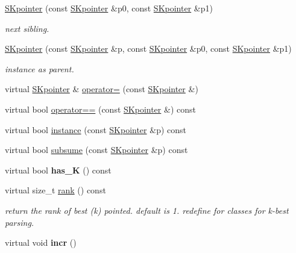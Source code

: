 \begin{DoxyCompactItemize}
\mbox{\hyperlink{group__table_gaf762b88808d2e8188b74e28256d3ed09}{S\+Kpointer}} (const \mbox{\hyperlink{classSKpointer}{S\+Kpointer}} \&p0, const \mbox{\hyperlink{classSKpointer}{S\+Kpointer}} \&p1)
\begin{DoxyCompactList}\small\item\em next sibling. \end{DoxyCompactList}\item 
\mbox{\hyperlink{group__table_ga8c3f64b049fb3809bec46ba47a124ab9}{S\+Kpointer}} (const \mbox{\hyperlink{classSKpointer}{S\+Kpointer}} \&p, const \mbox{\hyperlink{classSKpointer}{S\+Kpointer}} \&p0, const \mbox{\hyperlink{classSKpointer}{S\+Kpointer}} \&p1)
\begin{DoxyCompactList}\small\item\em instance as parent. \end{DoxyCompactList}\item 
virtual \mbox{\hyperlink{classSKpointer}{S\+Kpointer}} \& \mbox{\hyperlink{group__table_gaa75ae4ae4ce8c389471867fa64f503c1}{operator=}} (const \mbox{\hyperlink{classSKpointer}{S\+Kpointer}} \&)
\item 
virtual bool \mbox{\hyperlink{group__table_gab77c2fa945fcc938568ace9986c25324}{operator==}} (const \mbox{\hyperlink{classSKpointer}{S\+Kpointer}} \&) const
\item 
virtual bool \mbox{\hyperlink{group__table_ga95bdb4d9654b477a82f61d4e8b1d6937}{instance}} (const \mbox{\hyperlink{classSKpointer}{S\+Kpointer}} \&p) const
\item 
virtual bool \mbox{\hyperlink{group__table_ga38150ffb7a8bf25ebf5133907d568738}{subsume}} (const \mbox{\hyperlink{classSKpointer}{S\+Kpointer}} \&p) const
\item 
\mbox{\label{classSKpointer_afe3aef0a71afa0e6d022c52aa0f28163}} 
virtual bool {\bfseries has\+\_\+K} () const
\item 
\mbox{\label{classSKpointer_ae7afb64da3fbb9fc0487913f3ee594a3}} 
virtual size\+\_\+t \mbox{\hyperlink{classSKpointer_ae7afb64da3fbb9fc0487913f3ee594a3}{rank}} () const
\begin{DoxyCompactList}\small\item\em return the rank of best (k) pointed. default is 1. redefine for classes for k-\/best parsing. \end{DoxyCompactList}\item 
virtual void {\bfseries incr} ()
\end{DoxyCompactItemize}
